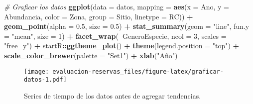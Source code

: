 \documentclass[]{krantz}
\newenvironment{Shaded}{\begin{snugshade}}{\end{snugshade}}
\newcommand{\CommentTok}[1]{\textcolor[rgb]{0.56,0.35,0.01}{\textit{#1}}}
\newcommand{\DataTypeTok}[1]{\textcolor[rgb]{0.13,0.29,0.53}{#1}}
\newcommand{\DecValTok}[1]{\textcolor[rgb]{0.00,0.00,0.81}{#1}}
\newcommand{\FloatTok}[1]{\textcolor[rgb]{0.00,0.00,0.81}{#1}}
\newcommand{\KeywordTok}[1]{\textcolor[rgb]{0.13,0.29,0.53}{\textbf{#1}}}
\newcommand{\NormalTok}[1]{#1}
\newcommand{\OperatorTok}[1]{\textcolor[rgb]{0.81,0.36,0.00}{\textbf{#1}}}
\newcommand{\StringTok}[1]{\textcolor[rgb]{0.31,0.60,0.02}{#1}}
\begin{document}
\begin{Shaded}
\begin{Highlighting}[]
\CommentTok{# Graficar los datos}
\KeywordTok{ggplot}\NormalTok{(}\DataTypeTok{data =}\NormalTok{ datos,}
       \DataTypeTok{mapping =} \KeywordTok{aes}\NormalTok{(}\DataTypeTok{x =}\NormalTok{ Ano, }\DataTypeTok{y =}\NormalTok{ Abundancia,}
                     \DataTypeTok{color =}\NormalTok{ Zona, }\DataTypeTok{group =}\NormalTok{ Sitio, }\DataTypeTok{linetype =}\NormalTok{ RC)) }\OperatorTok{+}
\StringTok{  }\KeywordTok{geom_point}\NormalTok{(}\DataTypeTok{alpha =} \FloatTok{0.5}\NormalTok{, }\DataTypeTok{size =} \FloatTok{0.5}\NormalTok{) }\OperatorTok{+}
\StringTok{  }\KeywordTok{stat_summary}\NormalTok{(}\DataTypeTok{geom =} \StringTok{"line"}\NormalTok{, }\DataTypeTok{fun.y =} \StringTok{"mean"}\NormalTok{, }\DataTypeTok{size =} \DecValTok{1}\NormalTok{) }\OperatorTok{+}
\StringTok{  }\KeywordTok{facet_wrap}\NormalTok{(}\OperatorTok{~}\NormalTok{GeneroEspecie, }\DataTypeTok{ncol =} \DecValTok{3}\NormalTok{, }\DataTypeTok{scales =} \StringTok{"free_y"}\NormalTok{) }\OperatorTok{+}
\StringTok{  }\NormalTok{startR}\OperatorTok{::}\KeywordTok{ggtheme_plot}\NormalTok{() }\OperatorTok{+}
\StringTok{  }\KeywordTok{theme}\NormalTok{(}\DataTypeTok{legend.position =} \StringTok{"top"}\NormalTok{) }\OperatorTok{+}
\StringTok{  }\KeywordTok{scale_color_brewer}\NormalTok{(}\DataTypeTok{palette =} \StringTok{"Set1"}\NormalTok{) }\OperatorTok{+}
\StringTok{  }\KeywordTok{xlab}\NormalTok{(}\StringTok{"Año"}\NormalTok{)}
\end{Highlighting}
\end{Shaded}

\begin{figure}
\centering
\texttt{[image: evaluacion-reservas\_files/figure-latex/graficar-datos-1.pdf]}
\caption{\label{fig:graficar-datos}Series de tiempo de los datos antes de
agregar tendencias.}
\end{figure}
\end{document}
